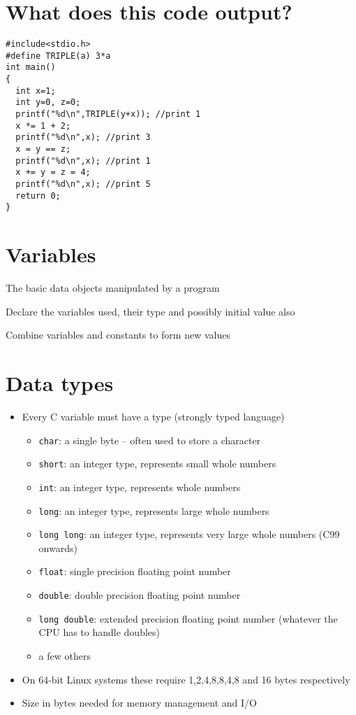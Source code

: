 \documentclass{article}
\begin{document}
\section{What does this code output?}
\begin{verbatim}
#include<stdio.h>
#define TRIPLE(a) 3*a
int main()
{
  int x=1;
  int y=0, z=0;
  printf("%d\n",TRIPLE(y+x)); //print 1
  x *= 1 + 2;
  printf("%d\n",x); //print 3
  x = y == z;
  printf("%d\n",x); //print 1
  x += y = z = 4;
  printf("%d\n",x); //print 5
  return 0;
}
\end{verbatim}

\section{Variables}
\begin{defin}
The basic data objects manipulated by a program	
\end{defin}
\begin{defin}[Declarations]
Declare the variables used, their type and possibly initial value also
\end{defin}
\begin{defin}[Expressions]
Combine variables and constants to form new values
\end{defin}




\section{Data types}
\begin{itemize}
\item Every C variable must have a type (strongly typed language) 

\begin{itemize}
\item \verb!char!: a single byte -- often used to store a character
\item \verb!short!: an integer type, represents small whole numbers
\item \verb!int!: an integer type, represents whole numbers
\item \verb!long!: an integer type, represents large whole numbers
\item \verb!long long!: an integer type, represents very large whole numbers (C99 onwards)
\item \verb!float!: single precision floating point number
\item \verb!double!: double precision floating point number
\item \verb!long double!: extended precision floating point number (whatever the CPU has to handle doubles)
\item a few others 
\end{itemize}

\item On 64-bit Linux systems these require 1,2,4,8,8,4,8 and 16 bytes respectively
\item Size in bytes needed for memory management and I/O
\end{itemize}
\end{document}
